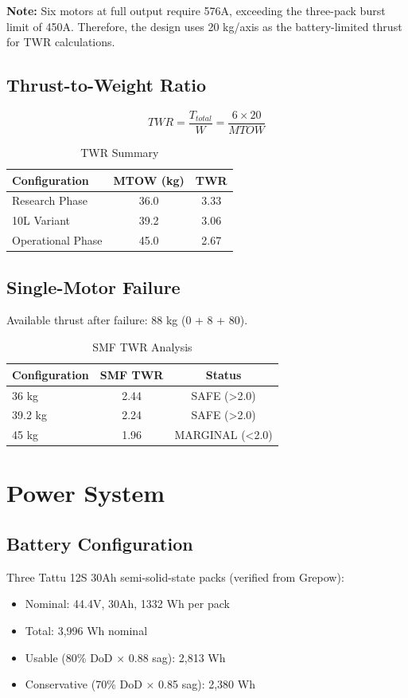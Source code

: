 \documentclass[12pt,a4paper]{article}
\begin{document}
\textbf{Note:} Six motors at full output require 576A, exceeding the three-pack burst limit of 450A. Therefore, the design uses 20 kg/axis as the battery-limited thrust for TWR calculations.

\subsection{Thrust-to-Weight Ratio}
\begin{equation}
    TWR = \frac{T_{total}}{W} = \frac{6 \times 20}{MTOW}
\end{equation}

\begin{table}[H]
\centering
\caption{TWR Summary}
\begin{tabular}{lcc}
\toprule
Configuration & MTOW (kg) & TWR \\
\midrule
Research Phase & 36.0 & 3.33 \\
10L Variant & 39.2 & 3.06 \\
Operational Phase & 45.0 & 2.67 \\
\bottomrule
\end{tabular}
\end{table}

\subsection{Single-Motor Failure}
Available thrust after failure: 88 kg (0 + 8 + 80).

\begin{table}[H]
\centering
\caption{SMF TWR Analysis}
\begin{tabular}{lcc}
\toprule
Configuration & SMF TWR & Status \\
\midrule
36 kg & 2.44 & SAFE (>2.0) \\
39.2 kg & 2.24 & SAFE (>2.0) \\
45 kg & 1.96 & MARGINAL (<2.0) \\
\bottomrule
\end{tabular}
\end{table}

\section{Power System}

\subsection{Battery Configuration}
Three Tattu 12S 30Ah semi-solid-state packs (verified from Grepow):
\begin{itemize}
    \item Nominal: 44.4V, 30Ah, 1332 Wh per pack
    \item Total: 3,996 Wh nominal
    \item Usable (80\% DoD × 0.88 sag): 2,813 Wh
    \item Conservative (70\% DoD × 0.85 sag): 2,380 Wh
\end{itemize}
\end{document}
